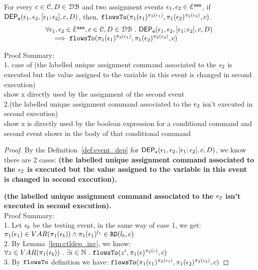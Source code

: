 \begin{lem}
	\label{lem:flowsto_soundness_emptytrace}
	For every $ c \in \mathcal{C}, D \in \mathcal{DB}$ and two assignment events $\mathtt{\epsilon}_1, \mathtt{\epsilon}_2 \in \mathcal{E}^{\mathtt{{asn}}}$,
	if $\mathsf{DEP_{\mathtt{e}}}(\mathtt{\epsilon}_1, \mathtt{\epsilon}_2, [\mathtt{\epsilon}_1; \mathtt{\epsilon}_2],  c, D) $,
	then, $\mathtt{flowsTo}(\pi_1(\mathtt{\epsilon}_1)^{\pi_2(\mathtt{\epsilon}_1)}, \pi_1(\mathtt{\epsilon}_2)^{\pi_2(\mathtt{\epsilon}_2)}, c)$.
	\[
	\begin{array}{l}
		\forall \mathtt{\epsilon}_1, \mathtt{\epsilon}_2 \in \mathcal{E}^{\mathtt{{asn}}}, c \in \mathcal{C}, D \in \mathcal{DB} 
		~.~ 
		\mathsf{DEP_{\mathtt{e}}}(\mathtt{\epsilon}_1, \mathtt{\epsilon}_2, [\mathtt{\epsilon}_1; \mathtt{\epsilon}_2],  c, D) 
		\\ \quad 
		\implies 
		\mathtt{flowsTo}(\pi_1(\mathtt{\epsilon}_1)^{\pi_2(\mathtt{\epsilon}_1)}, \pi_1(\mathtt{\epsilon}_2)^{\pi_2(\mathtt{\epsilon}_2)}, c)
	\end{array}
	\]
\end{lem}
Proof Summary:
\\
1. case of (the labelled unique assignment command associated to the $\mathtt{\epsilon}_2$ 
is executed but the value assigned to the variable in this event is changed in second execution)
\\
show x directly used by the assignment of the second event
\\
2.(the labelled unique assignment command associated to the $\mathtt{\epsilon}_2$ isn't executed in second execution)
\\
show x is directly used by the boolean expression for a conditional command and second event shows in the body of that conditional command 
%
\begin{proof}
	By the Definition~\ref{def:event_dep} for $\mathsf{DEP_{\mathtt{e}}}(\mathtt{\epsilon}_1, \mathtt{\epsilon}_2, [\mathtt{\epsilon}_1; \mathtt{\epsilon}_2], c, D)$, 
	we know there are 2 cases:
		\textbf{(the labelled unique assignment command associated to the $\mathtt{\epsilon}_2$ 
		is executed but the value assigned to the variable in this event is changed in second execution).}
	
		\textbf{(the labelled unique assignment command associated to the $\mathtt{\epsilon}_2$ isn't executed in second execution).}
		\\
		Proof Summary:
		\\
		1. Let $\mathtt{\epsilon}_b$ be the testing event,
		in the same way of case 1, we get:
		 $\pi_1(\mathtt{\epsilon}_1) \in VAR(\pi_1(\mathtt{\epsilon}_b)) 
		 \land 
		\pi_1(\mathtt{\epsilon}_1)^{l_1} \in \mathtt{RD}(l_b, c)$
		 \\
		 2. By Lemma~\ref{lem:ctldep_inv}, we know:
		   $\forall z \in VAR(\pi_1(\mathtt{\epsilon}_b)) ~.~ \exists i \in \mathbb{N} ~.~
		 \mathtt{flowsTo}(z^i, \pi_1(\mathtt{\epsilon})^{\pi_2(\mathtt{\epsilon})}, c)$
		 \\
		 3. By $\mathtt{flowsTo}$ definition we have:
		   $\mathtt{flowsTo}(\pi_1(\mathtt{\epsilon}_1)^{\pi_2(\mathtt{\epsilon}_1)}, \pi_1(\mathtt{\epsilon}_2)^{\pi_2(\mathtt{\epsilon}_2)}, c)$
		
\end{proof}
